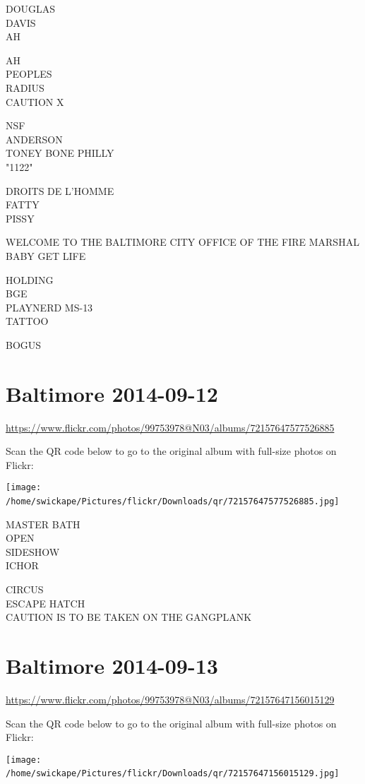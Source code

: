 \documentclass[10pt,letterpaper]{article}
\begin{document}
DOUGLAS\\
DAVIS\\
AH

AH\\
PEOPLES\\
RADIUS\\
CAUTION X

NSF\\
ANDERSON\\
TONEY BONE PHILLY\\
"1122"

DROITS DE L'HOMME\\
FATTY\\
PISSY

WELCOME TO THE BALTIMORE CITY OFFICE OF THE FIRE MARSHAL\\
BABY GET LIFE

HOLDING\\
BGE\\
PLAYNERD MS{-}13\\
TATTOO

BOGUS
\

\section*{Baltimore 2014-09-12}

\url{https://www.flickr.com/photos/99753978@N03/albums/72157647577526885}

Scan the QR code below to go to the original album with full-size photos on Flickr:

\texttt{[image: /home/swickape/Pictures/flickr/Downloads/qr/72157647577526885.jpg]}
\

MASTER BATH\\
OPEN\\
SIDESHOW\\
ICHOR

CIRCUS\\
ESCAPE HATCH\\
CAUTION IS TO BE TAKEN ON THE GANGPLANK
\

\section*{Baltimore 2014-09-13}

\url{https://www.flickr.com/photos/99753978@N03/albums/72157647156015129}

Scan the QR code below to go to the original album with full-size photos on Flickr:

\texttt{[image: /home/swickape/Pictures/flickr/Downloads/qr/72157647156015129.jpg]}
\
\end{document}
